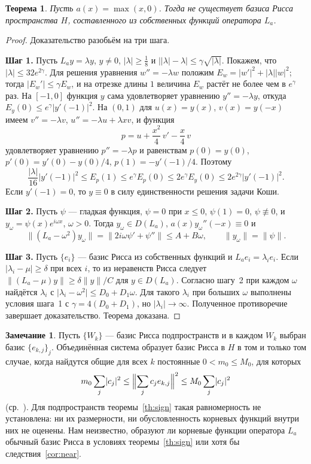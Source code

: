 \documentclass[12pt,a4paper]{article}
\newtheorem{theorem}{Теорема}
\theoremstyle{definition}
\newtheorem{remark}{Замечание}
\newcommand{\step}[1]{\smallskip\noindent\textbf{Шаг #1.}}
\newcommand{\norm}[1]{\lVert#1\rVert}
\newcommand{\abs}[1]{\lvert#1\rvert}
\begin{document}
\begin{theorem}\label{th:ramp}
Пусть $a(x)=\max(x,0)$. Тогда не существует базиса Рисса пространства $H$, составленного
из собственных функций оператора $L_a$.
\end{theorem}
\begin{proof}
Доказательство разобьём на три шага.

\step{1} Пусть $L_ay=\lambda y$, $y\ne0$, $\abs\lambda\ge\tfrac18$ и
$\bigl\lvert\abs\lambda-\lambda\bigr\rvert\le\gamma\sqrt{\abs\lambda}$. Покажем, что
$\abs\lambda\le32e^{2\gamma}$. Для решения уравнения $w''=-\lambda w$ положим
$E_w=\abs{w'}^2+\abs\lambda\abs w^2$; тогда $\abs{E_w'}\le\gamma E_w$, и на отрезке
длины $1$ величина $E_w$ растёт не более чем в $e^\gamma$ раз. На $[-1,0]$ функция $y$
сама удовлетворяет уравнению $y''=-\lambda y$, откуда
$E_y(0)\le e^\gamma\abs{y'(-1)}^2$. На $(0,1)$ для $u(x)=y(x)$, $v(x)=y(-x)$ имеем
$v''=-\lambda v$, $u''=-\lambda u+\lambda xv$, и функция
\[
 p=u+\frac{x^2}4\,v'-\frac x4\,v
\]
удовлетворяет уравнению $p''=-\lambda p$ и равенствам $p(0)=y(0)$,
$p'(0)=y'(0)-y(0)/4$, $p(1)=-y'(-1)/4$. Поэтому
\[
 \frac{\abs\lambda}{16}\abs{y'(-1)}^2\le E_p(1)\le e^\gamma E_p(0)\le2e^\gamma E_y(0)
 \le2e^{2\gamma}\abs{y'(-1)}^2 .
\]
Если $y'(-1)=0$, то $y\equiv0$ в силу единственности решения задачи Коши.

\step{2} Пусть $\psi$ --- гладкая функция, $\psi=0$ при $x\le0$, $\psi(1)=0$,
$\psi\not\equiv0$, и $y_\omega=\psi(x)e^{i\omega x}$, $\omega>0$. Тогда
$y_\omega\in D(L_a)$, $a(x)y_\omega''(-x)\equiv0$ и
\[
 \norm{(L_a-\omega^2)y_\omega}=\norm{2i\omega\psi'+\psi''}\le A+B\omega,\qquad
 \norm{y_\omega}=\norm\psi .
\]

\step{3} Пусть $\{e_i\}$ --- базис Рисса из собственных функций и
$L_ae_i=\lambda_ie_i$. Если $\abs{\lambda_i-\mu}\ge\delta$ при всех $i$, то из неравенств
Рисса следует $\norm{(L_a-\mu)y}\ge\delta\norm y/C$ для $y\in D(L_a)$. Согласно шагу~2
при каждом $\omega$ найдётся $\lambda_i$ с $\abs{\lambda_i-\omega^2}\le D_0+D_1\omega$.
Для такого $\lambda_i$ при больших $\omega$ выполнены условия шага~1 с
$\gamma=4(D_0+D_1)$, но $\abs{\lambda_i}\to\infty$. Полученное противоречие завершает
доказательство. Теорема доказана.
\end{proof}

\begin{remark}\label{rem:brackets}
Пусть $\{W_k\}$ --- базис Рисса подпространств и в каждом $W_k$ выбран базис
$\{e_{k,j}\}_j$. Объединённая система образует базис Рисса в $H$ в том и только том
случае, когда найдутся общие для всех $k$ постоянные $0<m_0\le M_0$, для которых
\[
 m_0\sum_j\abs{c_j}^2\le\Bigl\lVert\sum_jc_je_{k,j}\Bigr\rVert^2\le M_0\sum_j\abs{c_j}^2
\]
(ср.~\cite[предложение~3.2]{Wyss}). Для подпространств теоремы~\ref{th:sign} такая
равномерность не установлена: ни их размерности, ни обусловленность корневых функций
внутри них не оценены. Нам неизвестно, образуют ли корневые функции оператора $L_a$
обычный базис Рисса в условиях теоремы~\ref{th:sign} или хотя бы
следствия~\ref{cor:near}.
\end{remark}
\end{document}
